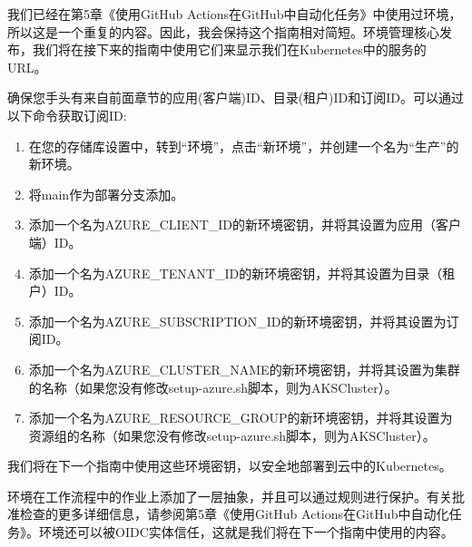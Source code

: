 我们已经在第5章《使用GitHub Actions在GitHub中自动化任务》中使用过环境，所以这是一个重复的内容。因此，我会保持这个指南相对简短。环境管理核心发布，我们将在接下来的指南中使用它们来显示我们在Kubernetes中的服务的URL。


确保您手头有来自前面章节的应用(客户端)ID、目录(租户)ID和订阅ID。可以通过以下命令获取订阅ID:



\begin{enumerate}
\item 
在您的存储库设置中，转到“环境”，点击“新环境”，并创建一个名为“生产”的新环境。

\item 
将main作为部署分支添加。

\item 
添加一个名为AZURE\_CLIENT\_ID的新环境密钥，并将其设置为应用（客户端）ID。

\item 
添加一个名为AZURE\_TENANT\_ID的新环境密钥，并将其设置为目录（租户）ID。

\item 
添加一个名为AZURE\_SUBSCRIPTION\_ID的新环境密钥，并将其设置为订阅ID。

\item 
添加一个名为AZURE\_CLUSTER\_NAME的新环境密钥，并将其设置为集群的名称（如果您没有修改setup-azure.sh脚本，则为AKSCluster）。

\item 
添加一个名为AZURE\_RESOURCE\_GROUP的新环境密钥，并将其设置为资源组的名称（如果您没有修改setup-azure.sh脚本，则为AKSCluster）。
\end{enumerate}

我们将在下一个指南中使用这些环境密钥，以安全地部署到云中的Kubernetes。


环境在工作流程中的作业上添加了一层抽象，并且可以通过规则进行保护。有关批准检查的更多详细信息，请参阅第5章《使用GitHub Actions在GitHub中自动化任务》。环境还可以被OIDC实体信任，这就是我们将在下一个指南中使用的内容。